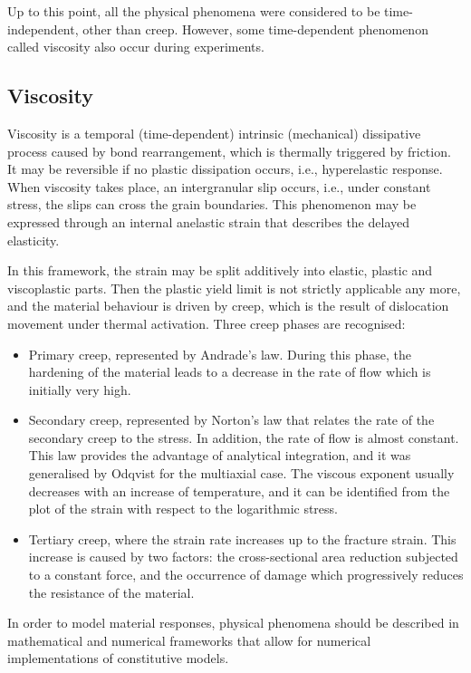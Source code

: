 Up to this point, all the physical phenomena were considered to be time-independent, other than creep. However, some time-dependent phenomenon called viscosity also occur during experiments.

\subsection{Viscosity}
Viscosity is a temporal (time-dependent) intrinsic (mechanical) dissipative process caused by bond rearrangement, which is thermally triggered by friction. It may be reversible if no plastic dissipation occurs, i.e., hyperelastic response. When viscosity takes place, an intergranular slip occurs, i.e., under constant stress, the slips can cross the grain boundaries. This phenomenon may be expressed through an internal anelastic strain that describes the delayed elasticity.

In this framework, the strain may be split additively into elastic, plastic and viscoplastic parts. Then the plastic yield limit is not strictly applicable any more, and the material behaviour is driven by creep, which is the result of dislocation movement under thermal activation. Three creep phases are recognised:

\begin{itemize}
	\item Primary creep, represented by Andrade's law. During this phase, the hardening of the material leads to a decrease in the rate of flow which is initially very high.
	\item Secondary creep, represented by Norton's law that relates the rate of the secondary creep to the stress. In addition, the rate of flow is almost constant. This law provides the advantage of analytical integration, and it was generalised by Odqvist for the multiaxial case. The viscous exponent usually decreases with an increase of temperature, and it can be identified from the plot of the strain with respect to the logarithmic stress.
	\item Tertiary creep, where the strain rate increases up to the fracture strain. This increase is caused by two factors: the cross-sectional area reduction subjected to a constant force, and the occurrence of damage which progressively reduces the resistance of the material.
\end{itemize}

In order to model material responses, physical phenomena should be described in mathematical and numerical frameworks that allow for numerical implementations of constitutive models.


